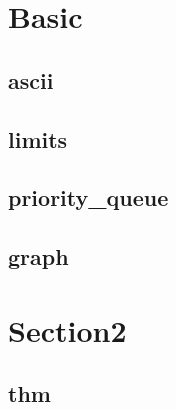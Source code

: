 \section{Basic}
    \subsection{ascii}
        
    \subsection{limits}
        
    \subsection{priority_queue}
        
    \subsection{graph}
        

\section{Section2}
    \subsection{thm}
        